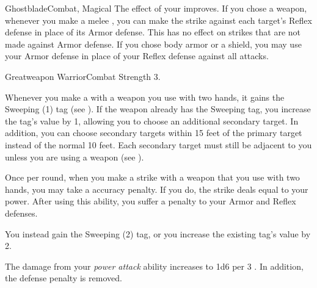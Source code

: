 \begin{magicalfeat}{Ghostblade}{Combat, Magical}
         The effect of your  improves.
        If you chose a weapon, whenever you make a melee , you can make the strike against each target's Reflex defense in place of its Armor defense.
        This has no effect on strikes that are not made against Armor defense.
        If you chose body armor or a shield, you may use your Armor defense in place of your Reflex defense against all attacks.
    \end{magicalfeat}

    \begin{feat}{Greatweapon Warrior}{Combat}
        \featpre Strength 3.

         Whenever you make a   with a weapon you use with two hands, it gains the Sweeping (1) tag (see ).
        If the weapon already has the Sweeping tag, you increase the tag's value by 1, allowing you to choose an additional secondary target.
        In addition, you can choose secondary targets within 15 feet of the primary target instead of the normal 10 feet.
        Each secondary target must still be adjacent to you unless you are using a  weapon (see ).

         Once per round, when you make a  strike with a weapon that you use with two hands, you may take a  accuracy penalty.
        If you do, the strike deals  equal to your power.
        After using this ability, you  suffer a  penalty to your Armor and Reflex defenses.

         You instead gain the Sweeping (2) tag, or you increase the existing tag's value by 2.

         The damage from your \textit{power attack} ability increases to 1d6 per 3 .
        In addition, the defense penalty is removed.
    \end{feat}

